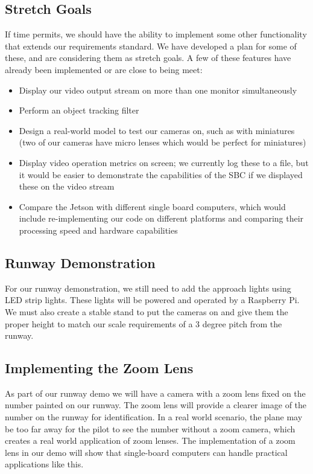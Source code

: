 \documentclass[letterpaper,10pt,titlepage]{IEEEtran}
\begin{document}
   \subsection{Stretch Goals}
	If time permits, we should have the ability to implement some other functionality that extends our requirements standard. We have developed a plan for some of these, and are considering them as stretch goals. A few of these features have already been implemented or are close to being meet:\\
	\begin{itemize}
		\item Display our video output stream on more than one monitor simultaneously  
		\item Perform an object tracking filter
		\item Design a real-world model to test our cameras on, such as with miniatures (two of our cameras have micro lenses which would be perfect for miniatures)
		\item Display video operation metrics on screen; we currently log these to a file, but it would be easier to demonstrate the capabilities of the SBC if we displayed these on the video stream
		\item Compare the Jetson with different single board computers, which would include re-implementing our code on different platforms and comparing their processing speed and hardware capabilities\\
	\end{itemize}
	
  \subsection{Runway Demonstration}
  For our runway demonstration, we still need to add the approach lights using LED strip lights. These lights will be powered and operated by a Raspberry Pi. We must also create a stable stand to put the cameras on and give them the proper height to match our scale requirements of a 3 degree pitch from the runway. 

  \subsection{Implementing the Zoom Lens}
  As part of our runway demo we will have a camera with a zoom lens fixed on the number painted on our runway. The zoom lens will provide a clearer image of the number on the runway for identification. In a real world scenario, the plane may be too far away for the pilot to see the number without a zoom camera, which creates a real world application of zoom lenses. The implementation of a zoom lens in our demo will show that single-board computers can handle practical applications like this.
\end{document}
